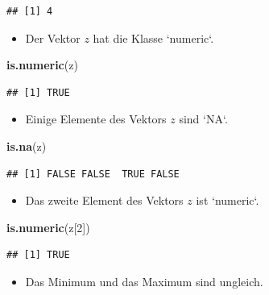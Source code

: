 \documentclass[12pt,a4paper]{article}
\newenvironment{Shaded}{\begin{snugshade}}{\end{snugshade}}
\newcommand{\DecValTok}[1]{\textcolor[rgb]{0.00,0.00,0.81}{#1}}
\newcommand{\FunctionTok}[1]{\textcolor[rgb]{0.13,0.29,0.53}{\textbf{#1}}}
\newcommand{\NormalTok}[1]{#1}
\begin{document}
\begin{verbatim}
## [1] 4
\end{verbatim}

\begin{itemize}
  \item Der Vektor $z$ hat die Klasse `numeric`.
\end{itemize}

\begin{Shaded}
\begin{Highlighting}[]
    \FunctionTok{is.numeric}\NormalTok{(z)}
\end{Highlighting}
\end{Shaded}

\begin{verbatim}
## [1] TRUE
\end{verbatim}

\begin{itemize}
  \item Einige Elemente des Vektors $z$ sind `NA`. 
\end{itemize}

\begin{Shaded}
\begin{Highlighting}[]
    \FunctionTok{is.na}\NormalTok{(z)}
\end{Highlighting}
\end{Shaded}

\begin{verbatim}
## [1] FALSE FALSE  TRUE FALSE
\end{verbatim}

\begin{itemize}
  \item Das zweite Element des Vektors $z$ ist `numeric`.
\end{itemize}

\begin{Shaded}
\begin{Highlighting}[]
    \FunctionTok{is.numeric}\NormalTok{(z[}\DecValTok{2}\NormalTok{])}
\end{Highlighting}
\end{Shaded}

\begin{verbatim}
## [1] TRUE
\end{verbatim}

\begin{itemize}
  \item Das Minimum und das Maximum sind ungleich. 
\end{itemize}
\end{document}
